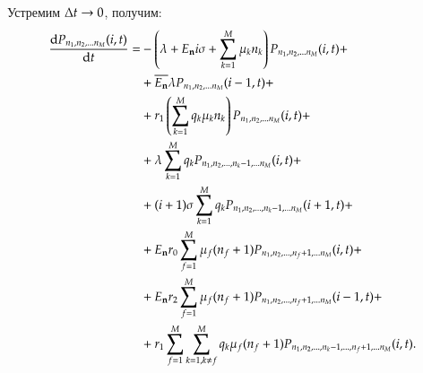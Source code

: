 Устремим \(\Delta t \rightarrow 0\), получим:
\begin{equation*}\begin{aligned}
\dv{ {P}_{{n}_1, {n}_2, ... {n}_{M}} (i,t)}{t}= 
    &-\left( {\lambda + E_{\bold{n}} i \sigma+\sum_{{k}=1}^{M}\mu_{k}{n}_{k}} \right){P}_{{n}_1, {n}_2, ... {n}_{M}}(i,t)+\\
    &+\overline{E_{\bold{n}}} \lambda {P}_{{n}_1, {n}_2, ... {n}_{M}}(i-1,t)+\\
    &+r_1 \left( {\sum_{{k}=1}^{M} q_{k}\mu_{k}{n}_{k}} \right) {P}_{{n}_1, {n}_2, ... {n}_{M}}(i,t) + \\
    &+\lambda\sum_{k=1}^{M}q_k {P}_{{n}_1, {n}_2, ... , {n}_{k} - 1, ... {n}_{M}}(i,t) + \\
    &+(i+1)\sigma\sum_{k=1}^{M}q_k {P}_{{n}_1, {n}_2, ... , {n}_{k} - 1, ... {n}_{M}}(i+1,t) + \\
    &+E_{\bold{n}} r_0 \sum_{f=1}^{M} \mu_f (n_f + 1) {P}_{{n}_1, {n}_2, ... , {n}_{f} + 1, ... {n}_{M}}(i,t) + \\
    &+E_{\bold{n}} r_2 \sum_{f=1}^{M} \mu_f (n_f + 1) {P}_{{n}_1, {n}_2, ... , {n}_{f} + 1, ... {n}_{M}}(i-1,t) + \\
    &+r_1 \sum_{{f}=1}^{M} \sum_{{k}=1, {k} \neq {f}}^{M}
        q_k \mu_f (n_f+1) {P}_{{n}_1, {n}_2, ... , {n}_{k} - 1, ... , {n}_{f} + 1, ... {n}_{M}}(i,t).
\end{aligned}\end{equation*}

